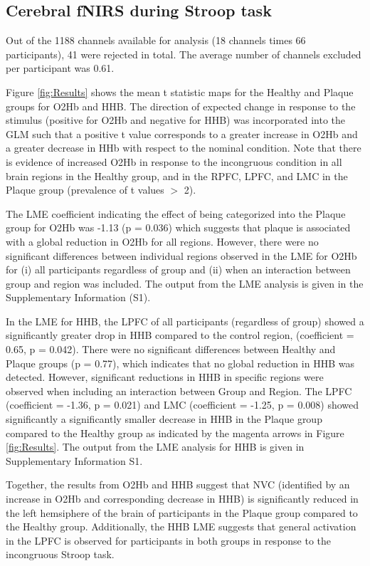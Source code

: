 \documentclass[12pt]{spieman}  %
\begin{document}
\begin{spacing}{2}
\subsection{Cerebral fNIRS during Stroop task}
Out of the 1188 channels available for analysis (18 channels times 66 participants), 41 were rejected in total. The average number of channels excluded per participant was 0.61. 

Figure \ref{fig:Results} shows the mean t statistic maps for the Healthy and Plaque groups for O2Hb and HHB. The direction of expected change in response to the stimulus (positive for O2Hb and negative for HHB) was incorporated into the GLM such that a positive t value corresponds to a greater increase in O2Hb and a greater decrease in HHb with respect to the nominal condition. Note that there is evidence of increased O2Hb in response to the incongruous condition in all brain regions in the Healthy group, and in the RPFC, LPFC, and LMC in the Plaque group (prevalence of t values $>$ 2). 

The LME coefficient indicating the effect of being categorized into the Plaque group for O2Hb was -1.13 (p = 0.036) which suggests that plaque is associated with a global reduction in O2Hb for all regions. However, there were no significant differences between individual regions observed in the LME for O2Hb for (i) all participants regardless of group and (ii) when an interaction between group and region was included. The output from the LME analysis is given in the Supplementary Information (S1). 

In the LME for HHB, the LPFC of all participants (regardless of group) showed a significantly greater drop in HHB compared to the control region, (coefficient = 0.65, p = 0.042). There were no significant differences between Healthy and Plaque groups (p = 0.77), which indicates that no global reduction in HHB was detected. However, significant reductions in HHB in specific regions were observed when including an interaction between Group and Region. The LPFC (coefficient = -1.36, p = 0.021) and LMC (coefficient = -1.25, p = 0.008) showed significantly a significantly smaller decrease in HHB in the Plaque group compared to the Healthy group as indicated by the magenta arrows in Figure \ref{fig:Results}. The output from the LME analysis for HHB is given in Supplementary Information S1. 

Together, the results from O2Hb and HHB suggest that NVC (identified by an increase in O2Hb and corresponding decrease in HHB) is significantly reduced in the left hemsiphere of the brain of participants in the Plaque group compared to the Healthy group. Additionally, the HHB LME suggests that general activation in the LPFC is observed for participants in both groups in response to the incongruous Stroop task.



\end{spacing}
\end{document}

